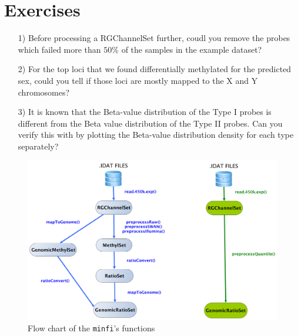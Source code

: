 \documentclass[12pt]{article}
\begin{document}
\section{Exercises}
\begin{itemize}
\item[1)] Before processing a RGChannelSet further, coudl you remove the probes which failed more than $50\%$ of the samples in the example dataset?
\item[2)] For the top loci that we found differentially methylated for the predicted sex, could you tell if those loci are mostly mapped to the X and Y chromosomes? 
\item[3)] It is known that the Beta-value distribution of the Type I probes is different from the Beta value distribution of the Type II probes. Can you verify this with by plotting the Beta-value distribution density for each type separately?  
\end{itemize}

 \begin{figure}
\centering
\includegraphics[scale=0.35]{images/flowChart3.png}
\caption{Flow chart of the \texttt{minfi}'s functions}
\end{figure}




\end{document}

